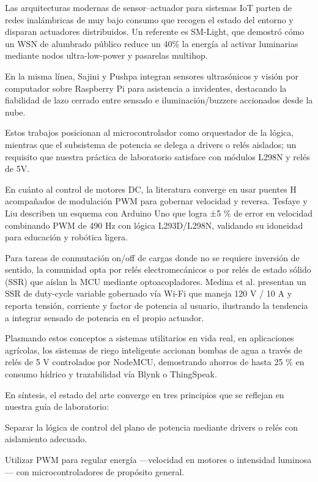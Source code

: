 Las arquitecturas modernas de sensor–actuador para sistemas IoT parten de redes inalámbricas de muy bajo consumo que recogen el estado del entorno y disparan actuadores distribuidos. Un referente es SM-Light, que demostró cómo un WSN de alumbrado público reduce un 40\% la energía al activar luminarias mediante nodos ultra-low-power y pasarelas multihop. \cite{karapetyan2020smlight}

En la misma línea, Sajini y Pushpa integran sensores ultrasónicos y visión por computador sobre Raspberry Pi para asistencia a invidentes, destacando la fiabilidad de lazo cerrado entre sensado e iluminación/buzzers accionados desde la nube. \cite{sajini2023proximity}

Estos trabajos posicionan al microcontrolador como orquestador de la lógica, mientras que el subsistema de potencia se delega a drivers o relés aislados; un requisito que nuestra práctica de laboratorio satisface con módulos L298N y relés de 5V.

En cuánto al control de motores DC, la literatura converge en usar puentes H acompañados de modulación PWM para gobernar velocidad y reversa. Tesfaye y Liu describen un esquema con Arduino Uno que logra ±5 \% de error en velocidad combinando PWM de 490 Hz con lógica L293D/L298N, validando su idoneidad para educación y robótica ligera. \cite{kaffale2025dcmotor}

Para tareas de conmutación on/off de cargas donde no se requiere inversión de sentido, la comunidad opta por relés electromecánicos o por relés de estado sólido (SSR) que aíslan la MCU mediante optoacopladores. Medina et al. presentan un SSR de duty-cycle variable gobernado vía Wi-Fi que maneja 120 V / 10 A y reporta tensión, corriente y factor de potencia al usuario, ilustrando la tendencia a integrar sensado de potencia en el propio actuador. \cite{medina2024ssr} 

Plasmando estos conceptos a sistemas utilitarios en vida real, en aplicaciones agrícolas, los sistemas de riego inteligente accionan bombas de agua a través de relés de 5 V controlados por NodeMCU, demostrando ahorros de hasta 25 \% en consumo hídrico y trazabilidad vía Blynk o ThingSpeak. \cite{muthekar2024smartirr}

En síntesis, el estado del arte converge en tres principios que se reflejan en nuestra guía de laboratorio:

Separar la lógica de control del plano de potencia mediante drivers o relés con aislamiento adecuado.

Utilizar PWM para regular energía —velocidad en motores o intensidad luminosa— con microcontroladores de propósito general.

